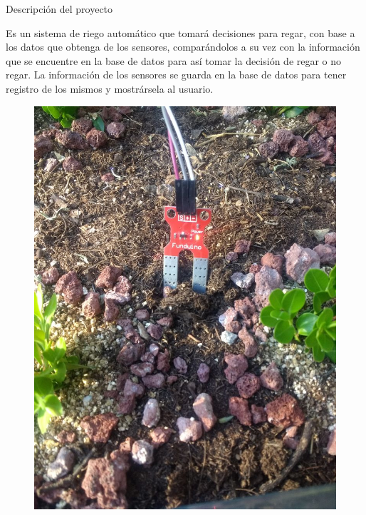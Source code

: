 \documentclass{beamer}
\begin{document}
\begin{frame}[fragile]{}
\begin{columns}[t]
	
	  \begin{column}{0.46\textwidth}
	  	\begin{block}{Descripción del proyecto}
	  		\begin{minipage}[t]{1\linewidth}
	  			\vspace{0pt} 
	  			Es un sistema de riego automático que tomará decisiones para regar, con base a los datos que obtenga de los sensores, comparándolos a su vez con la información que se encuentre en la base de datos para así tomar la decisión de regar o no regar. La información de los sensores se guarda en la base de datos para tener registro de los mismos y mostrársela al usuario.
	  			\begin{figure}[H]
	  				\centering
	  				\includegraphics[scale=0.5]{../graphics/s2}
	  			\end{figure}

			\end{minipage} 
	  	\end{block}
	  \end{column}
	

\end{columns}
\end{frame}
\end{document}
